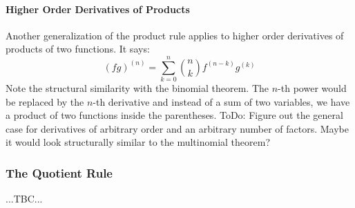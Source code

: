 
\paragraph{Higher Order Derivatives of Products}
Another generalization of the product rule applies to higher order derivatives of products of two functions. It says:
\begin{equation}
 (f g)^{(n)} = \sum_{k=0}^n \binom{n}{k}   f^{(n-k)} g^{(k)}
\end{equation}
Note the structural similarity with the binomial theorem. The $n$-th power would be replaced by the $n$-th derivative and instead of a sum of two variables, we have a product of two functions inside the parentheses. ToDo: Figure out the general case for derivatives of arbitrary order and an arbitrary number of factors. Maybe it would look structurally similar to the multinomial theorem?



\subsubsection{The Quotient Rule} ...TBC...

% 



